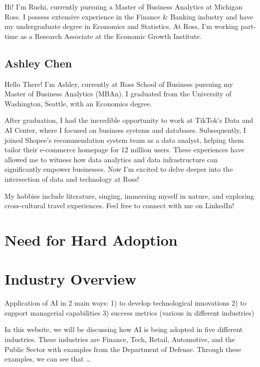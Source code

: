 \documentclass[
]{article}
\begin{document}
Hi! I'm Ruchi, currently pursuing a Master of Business Analytics at Michigan Ross. I possess extensive experience in the Finance \& Banking industry and have my undergraduate degree in Economics and Statistics. At Ross, I'm working part-time as a Research Associate at the Economic Growth Institute.

\hypertarget{ashley-chen}{%
\subsection{Ashley Chen}\label{ashley-chen}}

Hello There! I'm Ashley, currently at Ross School of Business pursuing my Master of Business Analytics (MBAn). I graduated from the University of Washington, Seattle, with an Economics degree.

After graduation, I had the incredible opportunity to work at TikTok's Data and AI Center, where I focused on business systems and databases. Subsequently, I joined Shopee's recommendation system team as a data analyst, helping them tailor their e-commerce homepage for 12 million users. These experiences have allowed me to witness how data analytics and data infrastructure can significantly empower businesses. Now I'm excited to delve deeper into the intersection of data and technology at Ross!

My hobbies include literature, singing, immersing myself in nature, and exploring cross-cultural travel experiences. Feel free to connect with me on LinkedIn!

\hypertarget{need-for-hard-adoption}{%
\section*{Need for Hard Adoption}\label{need-for-hard-adoption}}

\hypertarget{industry-overview}{%
\section{Industry Overview}\label{industry-overview}}

Application of AI in 2 main ways: 1) to develop technological innovations 2) to support managerial capabilities 3) success metrics (various in different industries)

In this website, we will be discussing how AI is being adopted in five different industries. These industries are Finance, Tech, Retail, Automotive, and the Public Sector with examples from the Department of Defense. Through these examples, we can see that \ldots{}
\end{document}
